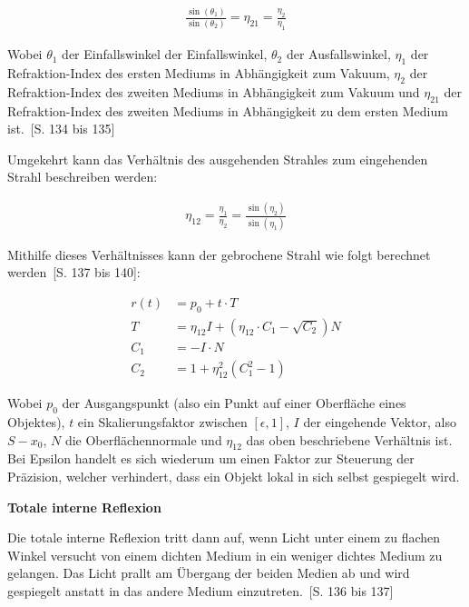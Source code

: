 \begin{gather}
    \frac{\sin(\theta_{1})}{\sin(\theta_{2})} = \eta_{21} = \frac{\eta_{2}}{\eta_{1}}
\end{gather}

Wobei $\theta_{1}$ der Einfallswinkel der Einfallswinkel, $\theta_{2}$
der Ausfallswinkel, $\eta_{1}$ der Refraktion-Index des ersten Mediums
in Abhängigkeit zum Vakuum, $\eta_{2}$ der Refraktion-Index des zweiten
Mediums in Abhängigkeit zum Vakuum und $\eta_{21}$ der Refraktion-Index
des zweiten Mediums in Abhängigkeit zu dem ersten Medium
ist.~\cite{glassner_introduction_1989}[S. 134 bis 135]

Umgekehrt kann das Verhältnis des ausgehenden Strahles zum eingehenden
Strahl beschreiben werden:

\begin{gather}
    \eta_{12} = \frac{\eta_{1}}{\eta_{2}} = \frac{\sin(\eta_{2})}{\sin(\eta_{1})}
\end{gather}

Mithilfe dieses Verhältnisses kann der gebrochene Strahl wie folgt
berechnet werden~\cite{glassner_introduction_1989}[S. 137 bis 140]:

\begin{align}
    r(t) &= p_{0} + t \cdot T \\
    T &= \eta_{12}I + (\eta_{12} \cdot C_{1} - \sqrt{C_{2}})N \label{eq:ray_tracing:tansm} \\
    C_{1} &= -I \cdot N \\
    C_{2} &= 1 + \eta_{12}^{2}(C_{1}^{2} - 1) \label{eq:ray_tracing:tansm_c2}
\end{align}

Wobei $p_{0}$ der Ausgangspunkt (also ein Punkt auf einer Oberfläche
eines Objektes), $t$ ein Skalierungsfaktor zwischen $[\epsilon, 1]$, $I$
der eingehende Vektor, also $S - x_{0}$, $N$ die Oberflächennormale und
$\eta_{12}$ das oben beschriebene Verhältnis ist.
Bei Epsilon handelt es sich wiederum um einen Faktor zur Steuerung
der Präzision, welcher verhindert, dass ein Objekt lokal in sich selbst
gespiegelt wird.


\textbf{Totale interne Reflexion}

Die totale interne Reflexion tritt dann auf, wenn Licht unter einem zu
flachen Winkel versucht von einem dichten Medium in ein weniger dichtes
Medium zu gelangen. Das Licht prallt am Übergang der beiden Medien ab
und wird gespiegelt anstatt in das andere Medium
einzutreten.~\cite{glassner_introduction_1989}[S. 136 bis 137]

